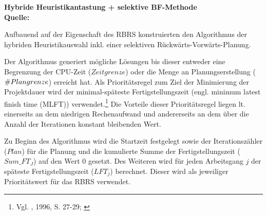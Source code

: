 \documentclass[a4paper,12pt,normalheadings,footexclude,headinclude,liststotoc,nochapterprefix,onecolumn,oneside,parskip,pointlessnumbers]{scrreprt}
\begin{document}

\begin{algorithm}[H]
\textbf{Hybride Heuristikantastung + selektive BF-Methode}\\
{}
{\footnotesize \textbf{Quelle:} \cite{tormos2003efficient}}
\end{algorithm}
Aufbauend auf der Eigenschaft des RBRS konstruierten \cite{tormos2003efficient} den Algorithmus der hybriden Heuristikauswahl inkl. einer selektiven Rückwärts-Vorwärts-Planung.

Der Algorithmus generiert mögliche Lösungen bis dieser entweder eine Begrenzung der CPU-Zeit ($Zeitgrenze$) oder die Menge an Planungserstellung ($\#Plan\-gren\-ze$) erreicht hat. Als Prioritätsregel zum Ziel der Minimierung der Projektdauer wird der minimal-späteste Fertigstellungszeit (engl. minimum latest finish time (MLFT)) verwendet.\footnote{Vgl. \citeauthor{kolisch1996adaptive}\label{unddasnoch}, 1996, S. 27-29; \cite{schirmer1998adaptive}} Die Vorteile dieser Prioritätsregel liegen lt. \cite{tormos2003efficient} einerseits an dem niedrigen Rechenaufwand und andererseits an dem über die Anzahl der Iterationen konstant bleibenden Wert.

Zu Beginn des Algorithmus wird die Startzeit festgelegt sowie der Iterationszähler ($Plan$) für die Planung und die kumulierte Summe der Fertigstellungszeit ($Sum\_FT_{J}$) auf den Wert $0$ gesetzt. Des Weiteren wird für jeden Arbeitsgang $j$ der späteste Fertigstellungszeit ($LFT_{j}$) berechnet. Dieser wird als jeweiliger Prioritätswert für das RBRS verwendet.
\end{document}
